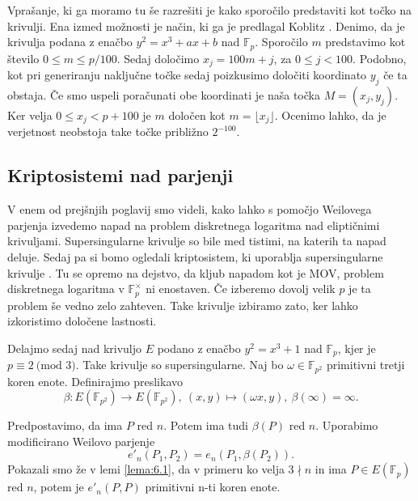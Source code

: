 \documentclass[12pt,a4paper,twoside]{article}
\theoremstyle{definition} %
\theoremstyle{plain} %
\numberwithin{equation}{section}  %
\newcommand{\F}{\mathbb F}
\newcommand{\E}[1]{E({#1})}
\newcommand{\MOD}[1]{\ \text{(mod }{#1}\text{)}}
\begin{document}
Vprašanje, ki ga moramo tu še razrešiti je kako sporočilo predstaviti kot točko na krivulji. Ena izmed možnosti je način, ki ga je predlagal Koblitz \cite{Koblitz1987}. Denimo, da je krivulja podana z enačbo
$y^2 = x^3+ax+b$ nad $\F_p$. Sporočilo $m$ predstavimo kot število $0 \leq m \leq p/100$. Sedaj določimo $x_j = 100m+j$, za $0\leq j < 100$. Podobno, kot pri generiranju naključne točke sedaj poizkusimo določiti koordinato $y_j$ če ta obstaja. Če smo uspeli poračunati obe koordinati je naša točka $M=(x_j,y_j)$. Ker velja $0\leq x_j < p+100$ je $m$ določen kot
$m = \lfloor x_j \rfloor$.
Ocenimo lahko, da je verjetnost neobstoja take točke približno $2^{-100}$.

\subsection{Kriptosistemi nad parjenji}

V enem od prejšnjih poglavij smo videli, kako lahko s pomočjo Weilovega parjenja izvedemo napad na problem diskretnega logaritma nad eliptičnimi krivuljami. Supersingularne krivulje so bile med tistimi, na katerih ta napad deluje. Sedaj pa si bomo ogledali kriptosistem, ki uporablja supersingularne krivulje \cite{Boneh2003}. Tu se opremo na dejstvo, da kljub napadom kot je MOV, problem diskretnega logaritma v $\F^{\times}_p$ ni enostaven. Če izberemo dovolj velik $p$ je ta problem še vedno zelo zahteven. Take krivulje izbiramo zato, ker lahko izkoristimo določene lastnosti.

Delajmo sedaj nad krivuljo $E$ podano z enačbo $y^2=x^3+1$ nad $\F_p$, kjer je $p \equiv 2 \MOD{3}$. Take krivulje so supersingularne. Naj bo $\omega \in \F_{p^2}$ primitivni tretji koren enote. Definirajmo preslikavo
$$\beta:\E{\F_{p^2}} \rightarrow \E{\F_{p^2}}, \ (x,y) \mapsto (\omega x,y), \ \beta(\infty) = \infty.$$

Predpostavimo, da ima $P$ red $n$. Potem ima tudi $\beta(P)$ red $n$. Uporabimo modificirano Weilovo parjenje
$$e'_n(P_1,P_2)  =e_n(P_1,\beta(P_2)).$$
Pokazali smo že v lemi \ref{lema:6.1}, da v primeru ko velja $3 \nmid n$ in ima $P \in \E{\F_p}$ red $n$, potem je $e'_n(P,P)$ primitivni n-ti koren enote.
\end{document}
